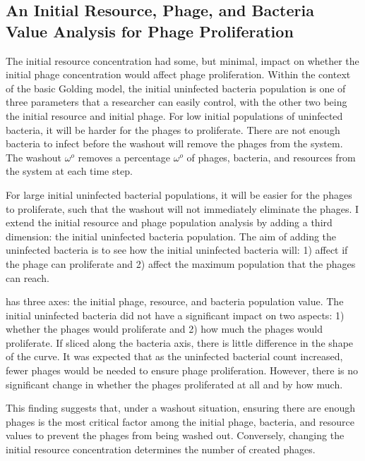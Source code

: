 \subsection{An Initial Resource, Phage, and Bacteria Value Analysis for Phage Proliferation}
The initial resource concentration had some, but minimal, impact on whether the initial phage concentration would affect phage proliferation. 
Within the context of the basic Golding model, the initial uninfected bacteria population is one of three parameters that a researcher can easily control, with the other two being the initial resource and initial phage. 
For low initial populations of uninfected bacteria, it will be harder for the phages to proliferate. 
There are not enough bacteria to infect before the washout will remove the phages from the system. 
The washout $\omega^o$ removes a percentage $\omega^o$ of phages, bacteria, and resources from the system at each time step. 

For large initial uninfected bacterial populations, it will be easier for the phages to proliferate, such that the washout will not immediately eliminate the phages. 
I extend the initial resource and phage population analysis by adding a third dimension: the initial uninfected bacteria population. 
The aim of adding the uninfected bacteria is to see how the initial uninfected bacteria will: 1) affect if the phage can proliferate and 2) affect the maximum population that the phages can reach. 

 has three axes: the initial phage, resource, and bacteria population value. 
The initial uninfected bacteria did not have a significant impact on two aspects: 1) whether the phages would proliferate and 2) how much the phages would proliferate. 
If sliced along the bacteria axis, there is little difference in the shape of the curve. 
It was expected that as the uninfected bacterial count increased, fewer phages would be needed to ensure phage proliferation. 
However, there is no significant change in whether the phages proliferated at all and by how much. 

This finding suggests that, under a washout situation, ensuring there are enough phages is the most critical factor among the initial phage, bacteria, and resource values to prevent the phages from being washed out. 
Conversely, changing the initial resource concentration determines the number of created phages. 

